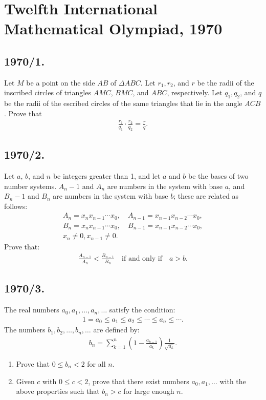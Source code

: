 \documentclass{article}
\begin{document}
\section*{Twelfth International Mathematical Olympiad, 1970}

\subsection*{1970/1.}
Let $ M $ be a point on the side $ AB $ of $ \Delta ABC $. Let $ r_1, r_2 $, and $ r $ be the radii of the inscribed circles of triangles $ AMC $, $ BMC $, and $ ABC $, respectively. Let $ q_1, q_2 $, and $ q $ be the radii of the escribed circles of the same triangles that lie in the angle $ ACB $. Prove that
\begin{align}
    \frac{r_1}{q_1} \cdot \frac{r_2}{q_2} = \frac{r}{q}.
\end{align}

\subsection*{1970/2.}
Let $ a $, $ b $, and $ n $ be integers greater than 1, and let $ a $ and $ b $ be the bases of two number systems. $ A_n-1 $ and $ A_n $ are numbers in the system with base $ a $, and $ B_n-1 $ and $ B_n $ are numbers in the system with base $ b $; these are related as follows:
\begin{align}
    A_n = x_n x_{n-1} \cdots x_0, \quad A_{n-1} = x_{n-1} x_{n-2} \cdots x_0,\\
    B_n = x_n x_{n-1} \cdots x_0, \quad B_{n-1} = x_{n-1} x_{n-2} \cdots x_0,\\
     x_n \neq 0,x_{n-1} \neq 0 .
\end{align}
\noindent Prove that:
\begin{align}
    \frac{A_{n-1}}{A_n} < \frac{B_{n-1}}{B_n} \quad \text{if and only if} \quad a > b.
\end{align}

\subsection*{1970/3.}
The real numbers $ a_0, a_1, \dots, a_n, \dots $ satisfy the condition:
\begin{align}
    1 = a_0 \leq a_1 \leq a_2 \leq \cdots \leq a_n \leq \cdots.
\end{align}
The numbers $ b_1, b_2, \dots, b_n, \dots $ are defined by:
\begin{align}
    b_n = \sum_{k=1}^{n} \left( 1 - \frac{a_{k-1}}{a_k} \right) \frac{1}{\sqrt{a_k}}.
\end{align}
\begin{enumerate}
    \item Prove that $ 0 \leq b_n < 2 $ for all $ n $.
    \item Given $ c $ with $ 0 \leq c < 2 $, prove that there exist numbers $ a_0, a_1, \dots $ with the above properties such that $ b_n > c $ for large enough $ n $.
\end{enumerate}
\end{document}
